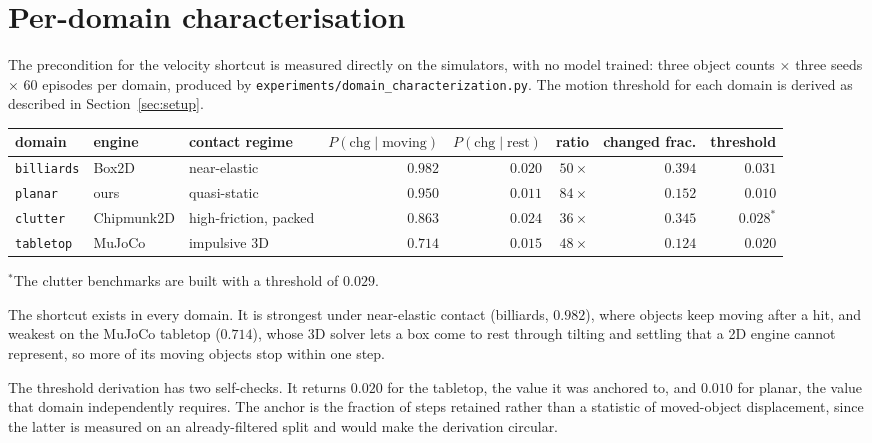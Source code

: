 \documentclass{article}
\begin{document}
\begin{center}
\small

\end{center}

\section{Per-domain characterisation}
\label{app:domains}
The precondition for the velocity shortcut is measured directly on the simulators, with no model
trained: three object counts $\times$ three seeds $\times$ $60$ episodes per domain, produced by
\texttt{experiments/domain\_characterization.py}. The motion threshold for each domain is derived
as described in Section~\ref{sec:setup}.

\begin{center}
\small
\begin{tabular}{lllrrrrr}
\toprule
domain & engine & contact regime & $P(\text{chg}\mid\text{moving})$ & $P(\text{chg}\mid\text{rest})$
& ratio & changed frac. & threshold \\
\midrule
\texttt{billiards} & Box2D & near-elastic & $0.982$ & $0.020$ & $50\times$ & $0.394$ & $0.031$ \\
\texttt{planar} & ours & quasi-static & $0.950$ & $0.011$ & $84\times$ & $0.152$ & $0.010$ \\
\texttt{clutter} & Chipmunk2D & high-friction, packed & $0.863$ & $0.024$ & $36\times$ & $0.345$ & $0.028^{*}$ \\
\texttt{tabletop} & MuJoCo & impulsive 3D & $0.714$ & $0.015$ & $48\times$ & $0.124$ & $0.020$ \\
\bottomrule
\end{tabular}

\smallskip
\footnotesize $^{*}$The clutter benchmarks are built with a threshold of $0.029$.
\end{center}

The shortcut exists in every domain. It is strongest under near-elastic contact (billiards,
$0.982$), where objects keep moving after a hit, and weakest on the MuJoCo tabletop ($0.714$),
whose 3D solver lets a box come to rest through tilting and settling that a 2D engine cannot
represent, so more of its moving objects stop within one step.

The threshold derivation has two self-checks. It returns $0.020$ for the tabletop, the value it
was anchored to, and $0.010$ for planar, the value that domain independently requires. The
anchor is the fraction of steps retained rather than a statistic of moved-object displacement,
since the latter is measured on an already-filtered split and would make the derivation
circular.
\end{document}
